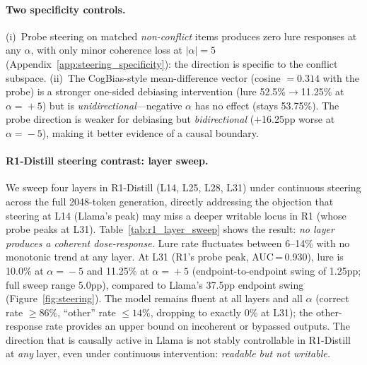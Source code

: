 \documentclass{article}
\begin{document}
\paragraph{Two specificity controls.}
(i)~Probe steering on matched \emph{non-conflict} items produces zero lure responses at any $\alpha$, with only minor coherence loss at $|\alpha|\!=\!5$ (Appendix~\ref{app:steering_specificity}): the direction is specific to the conflict subspace.  (ii)~The CogBias-style mean-difference vector (cosine $= 0.314$ with the probe) is a stronger one-sided debiasing intervention (lure 52.5\%$\to$11.25\% at $\alpha\!=\!+5$) but is \emph{unidirectional}---negative $\alpha$ has no effect (stays 53.75\%).  The probe direction is weaker for debiasing but \emph{bidirectional} ($+$16.25pp worse at $\alpha\!=\!-5$), making it better evidence of a causal boundary.

\paragraph{R1-Distill steering contrast: layer sweep.}
We sweep four layers in R1-Distill (L14, L25, L28, L31) under continuous
steering across the full 2048-token generation, directly addressing the
objection that steering at L14 (Llama's peak) may miss a deeper writable
locus in R1 (whose probe peaks at L31).  Table~\ref{tab:r1_layer_sweep}
shows the result: \emph{no layer produces a coherent dose-response.}
Lure rate fluctuates between 6--14\% with no monotonic trend at any
layer.  At L31 (R1's probe peak, AUC\,=\,0.930), lure is 10.0\% at
$\alpha\!=\!-5$ and 11.25\% at $\alpha\!=\!+5$ (endpoint-to-endpoint
swing of 1.25pp; full sweep range 5.0pp), compared to Llama's 37.5pp
endpoint swing (Figure~\ref{fig:steering}).  The model
remains fluent at all layers and all $\alpha$ (correct rate $\geq 86\%$,
``other'' rate $\leq 14\%$, dropping to exactly 0\% at L31); the other-response rate provides an upper bound on incoherent or bypassed outputs.  The direction that is causally active in
Llama is not stably controllable in R1-Distill at \emph{any} layer, even
under continuous intervention: \emph{readable but not writable.}
\end{document}
